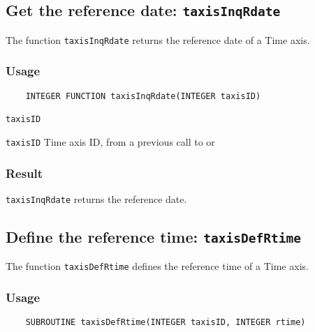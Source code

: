 \subsection{Get the reference date: \texttt{taxisInqRdate}}
\label{taxisInqRdate}

The function {\texttt{taxisInqRdate}} returns the reference date of a Time axis.

\subsubsection*{Usage}

\begin{verbatim}
    INTEGER FUNCTION taxisInqRdate(INTEGER taxisID)
\end{verbatim}

\hspace*{4mm}\begin{minipage}[]{15cm}
\begin{deflist}{\texttt{taxisID}\ }
\item[\texttt{taxisID}]
Time axis ID, from a previous call to {} or {}

\end{deflist}
\end{minipage}

\subsubsection*{Result}

{\texttt{taxisInqRdate}} returns the reference date.



\subsection{Define the reference time: \texttt{taxisDefRtime}}
\label{taxisDefRtime}

The function {\texttt{taxisDefRtime}} defines the reference time of a Time axis.

\subsubsection*{Usage}

\begin{verbatim}
    SUBROUTINE taxisDefRtime(INTEGER taxisID, INTEGER rtime)
\end{verbatim}

